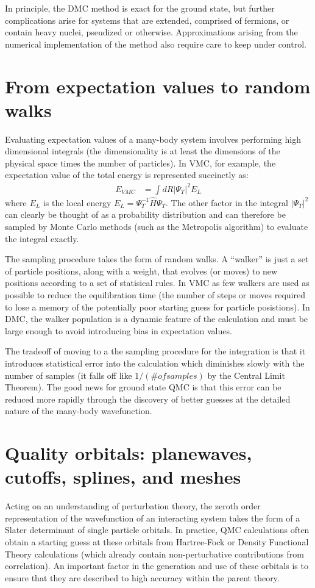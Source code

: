 \documentclass[oneside,11pt]{memoir}
\numberwithin{equation}{section}
\newcommand{\abs}[1]{\lvert #1 \rvert}
\begin{document}
In principle, the DMC method is exact for the ground state, but further 
complications arise for systems that are extended, comprised of fermions, 
or contain heavy nuclei, pseudized or otherwise.  Approximations arising 
from the numerical implementation of the method also require care to keep 
under control.


\section{From expectation values to random walks}
Evaluating expectation values of a many-body system involves performing high 
dimensional integrals (the dimensionality is at least the dimensions of the 
physical space times the number of particles).  In VMC, for example, the 
expectation value of the total energy is represented succinctly as:
\begin{align}
  E_{VMC} &= \int dR \abs{\Psi_T}^2 E_L
\end{align}
where $E_L$ is the local energy $E_L=\Psi_T^{-1}\hat{H}\Psi_T$.  The other 
factor in the integral $\abs{\Psi_T}^2$ can clearly be thought of as a 
probability distribution and can therefore be sampled by Monte Carlo 
methods (such as the Metropolis algorithm) to evaluate the integral exactly.

The sampling procedure takes the form of random walks.  A ``walker'' is just 
a set of particle positions, along with a weight, that evolves (or moves) to 
new positions according to a set of statisical rules.  In VMC as few walkers 
are used as possible to reduce the equilibration time (the number of steps or 
moves required to lose a memory of the potentially poor starting guess for 
particle posistions).  In DMC, the walker population is a dynamic feature of 
the calculation and must be large enough to avoid introducing bias in 
expectation values.

The tradeoff of moving to a the sampling procedure for the integration is that 
it introduces statistical error 
into the calculation which diminishes slowly with the number of samples 
(it falls off like $1/(\# of samples)$ by the Central Limit Theorem).  The 
good news for ground state QMC is that this error can be reduced more rapidly 
through the discovery of better guesses at the detailed nature of the 
many-body wavefunction.


\section{Quality orbitals: planewaves, cutoffs, splines, and meshes}
Acting on an understanding of perturbation theory, the zeroth order 
representation of the wavefunction of an interacting system takes the form 
of a Slater determinant of single particle orbitals.  In practice, QMC 
calculations often obtain a starting guess at these orbitals from Hartree-Fock 
or Density Functional Theory calculations (which already contain 
non-perturbative contributions from correlation).  An important factor 
in the generation and use of these orbitals is to ensure that they are 
described to high accuracy within the parent theory.
\end{document}
